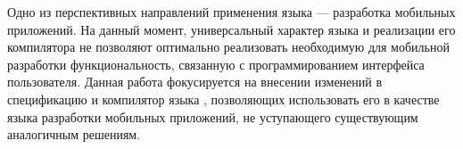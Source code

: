 Одно из перспективных направлений применения языка  ---
разработка мобильных приложений. На данный момент, универсальный характер
языка и реализации его компилятора не позволяют оптимально реализовать
необходимую для мобильной разработки функциональность, связанную с
программированием интерфейса пользователя.  Данная работа фокусируется на
внесении изменений в спецификацию и компилятор языка ,
позволяющих использовать его в качестве языка разработки мобильных
приложений, не уступающего существующим аналогичным решениям.
